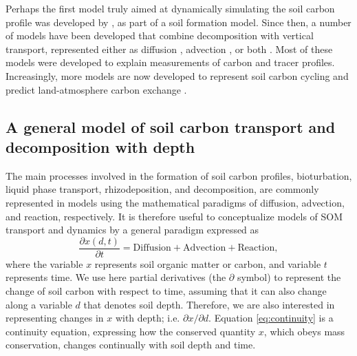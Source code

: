 \documentclass[11pt, oneside, a4paper]{article}   	%
\begin{document}
Perhaps the first model truly aimed at dynamically simulating the soil carbon profile
was developed by \citet{Kirkby1977}, as part of a soil formation model. Since then, a
number of models have been developed that combine decomposition with vertical
transport, represented either as diffusion \citep{OBrien1978, vanDam1997, Koven2009}, advection \citep{Nakane1978, Dorr1989, Bosatta1996, Feng1999, Baisden2002, Jenkinson2008}, or both \citep{Elzein1995, Bruun2007, Freier2010, Guenet2013, Koven2013BGS, Braakhekke2011, Braakhekke2013}. Most of these models were developed to
explain measurements of carbon and tracer profiles. Increasingly, more models are now developed to represent soil carbon cycling and predict land-atmosphere carbon exchange \citep{Jenkinson2008,Huang2018, Koven2013BGS, Ahrens2020, Luo2020}. 

\subsection{A general model of soil carbon transport and decomposition with depth}
The main processes involved in the formation of soil carbon profiles, bioturbation, liquid phase transport, rhizodeposition, and decomposition, are commonly represented in models using the mathematical paradigms of diffusion, advection, and reaction, respectively.
It is therefore useful to conceptualize models of SOM transport and dynamics by a general paradigm expressed as
\begin{equation} \label{eq:continuity}
\frac{\partial x(d, t)}{\partial t} = \mathrm{Diffusion} + \mathrm{Advection} + \mathrm{Reaction},
\end{equation}
where the variable $x$ represents soil organic matter or carbon, and variable $t$ represents time. We use here partial derivatives (the $\partial$ symbol) to represent the change of soil carbon with respect to time, assuming that it can also change along a variable $d$ that denotes soil depth. Therefore, we are also interested in representing changes in $x$ with depth; i.e. $\partial x/\partial d$. Equation \ref{eq:continuity} is a continuity equation, expressing how the conserved quantity $x$, which obeys mass conservation, changes continually with soil depth and time. 
\end{document}
